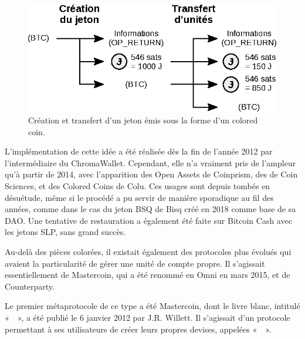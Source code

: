 \begin{figure}[h]
  \centering
  \includegraphics[scale=1]{img/colored-coin.eps}
  \caption{Création et transfert d'un jeton émis sous la forme d'un colored coin.}
  \label{fig:colored-coin}
\end{figure}

L'implémentation de cette idée a été réalisée dès la fin de l'année 2012 par l'intermédiaire du ChromaWallet. Cependant, elle n'a vraiment pris de l'ampleur qu'à partir de 2014, avec l'apparition des Open Assets de Coinprism, des  de Coin Sciences, et des Colored Coins de Colu. Ces usages sont depuis tombés en désuétude, même si le procédé a pu servir de manière sporadique au fil des années, comme dans le cas du jeton BSQ de Bisq créé en 2018 comme base de sa DAO. Une tentative de restauration a également été faite sur Bitcoin Cash avec les jetons SLP, sans grand succès. %

Au-delà des pièces colorées, il existait également des protocoles plus évolués qui avaient la particularité de gérer une unité de compte propre. Il s'agissait essentiellement de Mastercoin, qui a été renommé en Omni en mars 2015, et de Counterparty.

Le premier métaprotocole de ce type a été Mastercoin, dont le livre blanc, intitulé «~~», a été publié le 6 janvier 2012 par J.R. Willett. Il s'agissait d'un protocole permettant à ses utilisateurs de créer leurs propres devises, appelées «~~».


